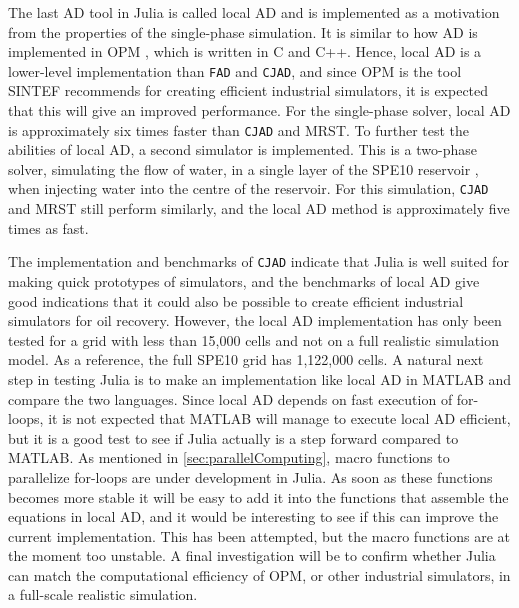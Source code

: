The last AD tool in Julia is called local AD and is implemented as a motivation from the properties of the single-phase simulation. It is similar to how AD is implemented in OPM \emph{\citep{opm}}, which is written in C and C++. Hence, local AD is a lower-level implementation than \texttt{FAD} and \texttt{CJAD}, and since OPM is the tool SINTEF recommends for creating efficient industrial simulators, it is expected that this will give an improved performance. For the single-phase solver, local AD is approximately six times faster than \texttt{CJAD} and MRST. To further test the abilities of local AD, a second simulator is implemented. This is a two-phase solver, simulating the flow of water, in a single layer of the SPE10 reservoir \emph{\citep{SPE10}}, when injecting water into the centre of the reservoir. For this simulation, \texttt{CJAD} and MRST still perform similarly, and the local AD method is approximately five times as fast.

The implementation and benchmarks of \texttt{CJAD} indicate that Julia is well suited for making quick prototypes of simulators, and the benchmarks of local AD give good indications that it could also be possible to create efficient industrial simulators for oil recovery. However, the local AD implementation has only been tested for a grid with less than 15,000 cells and not on a full realistic simulation model. As a reference, the full SPE10 grid has 1,122,000 cells. A natural next step in testing Julia is to make an implementation like local AD in MATLAB and compare the two languages. Since local AD depends on fast execution of for-loops, it is not expected that MATLAB will manage to execute local AD efficient, but it is a good test to see if Julia actually is a step forward compared to MATLAB. As mentioned in \autoref{sec:parallelComputing}, macro functions to parallelize for-loops are under development in Julia. As soon as these functions becomes more stable it will be easy to add it into the functions that assemble the equations in local AD, and it would be interesting to see if this can improve the current implementation. This has been attempted, but the macro functions are at the moment too unstable. A final investigation will be to confirm whether Julia can match the computational efficiency of OPM, or other industrial simulators, in a full-scale realistic simulation. 

